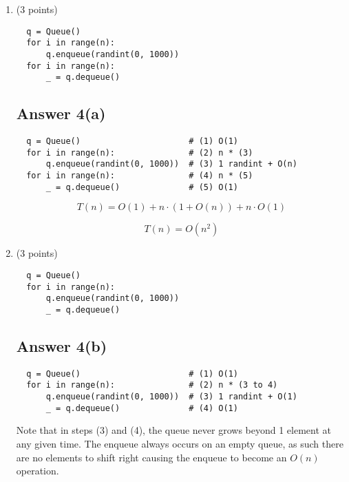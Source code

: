 \documentclass{article}
\begin{document}
\begin{enumerate}[label=(\alph*)]

\item (3 points)
\begin{verbatim}
  q = Queue()
  for i in range(n):
      q.enqueue(randint(0, 1000))
  for i in range(n):
      _ = q.dequeue()
\end{verbatim}

\subsection*{Answer 4(a)}

\begin{verbatim}
  q = Queue()                      # (1) O(1)
  for i in range(n):               # (2) n * (3)
      q.enqueue(randint(0, 1000))  # (3) 1 randint + O(n)
  for i in range(n):               # (4) n * (5)
      _ = q.dequeue()              # (5) O(1)
\end{verbatim}

\begin{equation*}
  T(n) = O(1) + n \cdot (1 + O(n)) + n \cdot O(1)
\end{equation*}

\begin{equation*}
  \boxed{T(n) = O(n^2)}
\end{equation*}

\item (3 points)

\begin{verbatim}
  q = Queue()
  for i in range(n):
      q.enqueue(randint(0, 1000))
      _ = q.dequeue()
\end{verbatim}

\subsection*{Answer 4(b)}

\begin{verbatim}
  q = Queue()                      # (1) O(1)
  for i in range(n):               # (2) n * (3 to 4)
      q.enqueue(randint(0, 1000))  # (3) 1 randint + O(1)
      _ = q.dequeue()              # (4) O(1)
\end{verbatim}

Note that in steps (3) and (4), the queue never grows beyond
1 element at any given time.  The enqueue always occurs on an empty
queue, as such there are no elements to shift right causing
the enqueue to become an $O(n)$ operation.


\end{enumerate}
\end{document}

